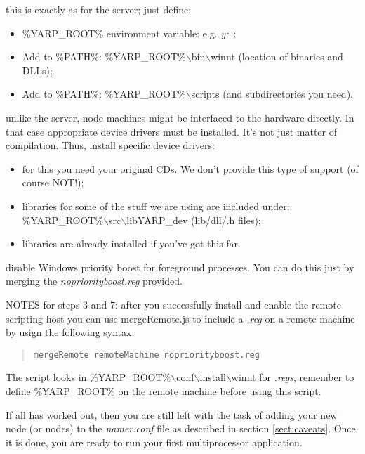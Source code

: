  this is exactly as for the server; just define:
\begin{itemize}
\item \%YARP\_ROOT\% environment variable: e.g. {\em y:}~;
\item Add to \%PATH\%: \%YARP\_ROOT\%$\backslash$bin$\backslash$winnt (location of binaries and DLLs);
\item Add to \%PATH\%: \%YARP\_ROOT\%$\backslash$scripts (and subdirectories you need).
\end{itemize}

 unlike the server, node machines might be interfaced to the hardware directly. In that case appropriate device drivers must be installed. It's not just matter of compilation.
Thus, install specific device drivers:
\begin{itemize}
\item for this you need your original CDs. We don't provide this type of support (of course NOT!);
\item libraries for some of the stuff we are using are included under: \%YARP\_ROOT\%$\backslash$src$\backslash$libYARP\_dev (lib/dll/.h files);
\item libraries are already installed if you've got this far.
\end{itemize}

 disable Windows priority boost for foreground processes. You can do this just by merging the {\em nopriorityboost.reg} provided.

\vspace{1cm}
NOTES for steps 3 and 7: after you successfully install and enable the remote scripting host you can use mergeRemote.js to include a {\em .reg} on a remote machine by usign the following syntax:
\begin{quote}
\tt{mergeRemote remoteMachine nopriorityboost.reg}
\end{quote}

The script looks in \%YARP\_ROOT\%$\backslash$conf$\backslash$install$\backslash$winnt for {\em .regs}, remember to define
\%YARP\_ROOT\% on the remote machine before using this script.

If all has worked out, then you are still left with the task of adding your new node (or nodes) to the {\em namer.conf} file as described in section \ref{sect:caveats}. Once it is done, you are ready to run your first multiprocessor application.

